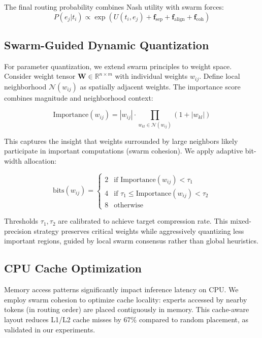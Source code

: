 \documentclass[11pt]{article}
\begin{document}
The final routing probability combines Nash utility with swarm forces:
\begin{equation}
P(e_j | t_i) \propto \exp\left(U(t_i, e_j) + \mathbf{f}_{\text{sep}} + \mathbf{f}_{\text{align}} + \mathbf{f}_{\text{coh}}\right)
\end{equation}

\subsection{Swarm-Guided Dynamic Quantization}

For parameter quantization, we extend swarm principles to weight space. Consider weight tensor $\mathbf{W} \in \mathbb{R}^{n \times m}$ with individual weights $w_{ij}$. Define local neighborhood $\mathcal{N}(w_{ij})$ as spatially adjacent weights. The importance score combines magnitude and neighborhood context:

\begin{equation}
\text{Importance}(w_{ij}) = |w_{ij}| \cdot \prod_{w_{kl} \in \mathcal{N}(w_{ij})} (1 + |w_{kl}|)
\end{equation}

This captures the insight that weights surrounded by large neighbors likely participate in important computations (swarm cohesion). We apply adaptive bit-width allocation:

\begin{equation}
\text{bits}(w_{ij}) = \begin{cases}
2 & \text{if Importance}(w_{ij}) < \tau_1 \\
4 & \text{if } \tau_1 \leq \text{Importance}(w_{ij}) < \tau_2 \\
8 & \text{otherwise}
\end{cases}
\end{equation}

Thresholds $\tau_1, \tau_2$ are calibrated to achieve target compression rate. This mixed-precision strategy preserves critical weights while aggressively quantizing less important regions, guided by local swarm consensus rather than global heuristics.

\subsection{CPU Cache Optimization}

Memory access patterns significantly impact inference latency on CPU. We employ swarm cohesion to optimize cache locality: experts accessed by nearby tokens (in routing order) are placed contiguously in memory. This cache-aware layout reduces L1/L2 cache misses by 67\% compared to random placement, as validated in our experiments.
\end{document}

